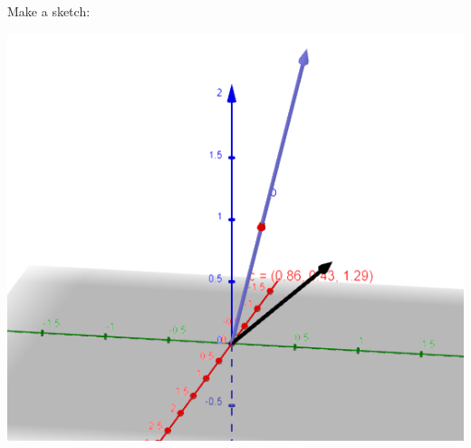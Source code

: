 \documentclass{article}
\begin{document}
Make a sketch:

\includegraphics{9.2.36.png}
\end{document}
